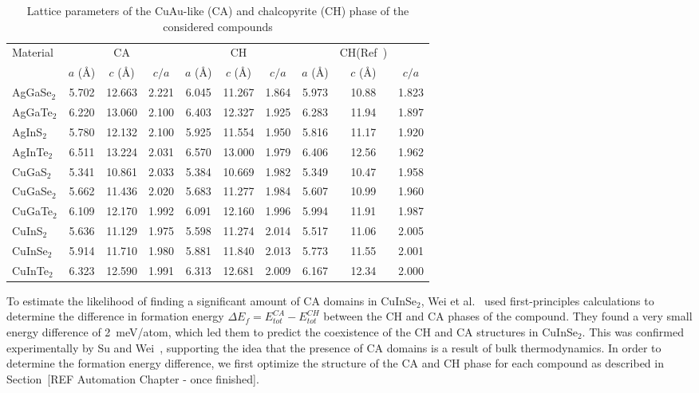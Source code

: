 \begin{refsection}
\begin{table}[ht] 
\centering 
\renewcommand{\arraystretch}{1.5} 
\caption{Lattice parameters of the \mbox{CuAu-like} (CA) and chalcopyrite (CH) 
phase of the considered compounds} 
\label{slme:tab-lattice} 
\begin{tabular*}{\textwidth}{@{\extracolsep{\fill}}lccccccccc}\hline 
\multirow{2}{*}{Material}    & & CA & & & CH & & & CH(Ref~\cite{Hahn1953}) & 
\\ \cmidrule(lr){2-4} \cmidrule(lr){5-7} \cmidrule(lr){8-10} 
 			&  $a$ (\si{\angstrom}) & $c$ (\si{\angstrom}) & $c/a$ & $a$ 
(\si{\angstrom}) & $c$ (\si{\angstrom}) & $c/a$ & $a$ (\si{\angstrom}) & $c$ 
(\si{\angstrom}) & $c/a$ \\\hline 
AgGaSe$_2$ 	& 5.702 & 12.663 & 2.221 & 6.045 & 11.267 & 1.864 & 5.973 & 10.88 
& 1.823 \\ 
AgGaTe$_2$ 	& 6.220 & 13.060 & 2.100 & 6.403 & 12.327 & 1.925 & 6.283 & 11.94 
& 1.897 \\ 
AgInS$_2$  	& 5.780 & 12.132 & 2.100 & 5.925 & 11.554 & 1.950 & 5.816 & 11.17 
& 1.920 \\ 
AgInTe$_2$ 	& 6.511 & 13.224 & 2.031 & 6.570 & 13.000 & 1.979 & 6.406 & 12.56 
& 1.962 \\ 
CuGaS$_2$  	& 5.341 & 10.861 & 2.033 & 5.384 & 10.669 & 1.982 & 5.349 & 10.47 
& 1.958 \\ 
CuGaSe$_2$ 	& 5.662 & 11.436 & 2.020 & 5.683 & 11.277 & 1.984 & 5.607 & 10.99 
& 1.960 \\ 
CuGaTe$_2$ 	& 6.109 & 12.170 & 1.992 & 6.091 & 12.160 & 1.996 & 5.994 & 11.91 
& 1.987 \\ 
CuInS$_2$ 	& 5.636 & 11.129 & 1.975 & 5.598 & 11.274 & 2.014 & 5.517 & 11.06 & 
2.005 \\ 
CuInSe$_2$ 	& 5.914 & 11.710 & 1.980 & 5.881 & 11.840 & 2.013 & 5.773 & 11.55 
& 2.001 \\ 
CuInTe$_2$ 	& 6.323 & 12.590 & 1.991 & 6.313 & 12.681 & 2.009 & 6.167 & 12.34 
& 2.000 \\ \hline 
\end{tabular*} 
\end{table} 

To estimate the likelihood of finding a significant amount of CA domains in 
CuInSe$_2$, Wei et al.~\cite{Wei1999} used first-principles calculations to 
determine the difference in formation energy $\Delta E_f = E_{tot}^{CA} - 
E_{tot}^{CH}$ between the CH and CA phases of the compound. They found a very 
small energy difference of 2~\si{\milli\electronvolt}/atom, which led them to 
predict the coexistence of the CH and CA structures in CuInSe$_2$. This was 
confirmed experimentally by Su and Wei~\cite{Su1999}, supporting the idea that 
the presence of CA domains is a result of bulk thermodynamics. In order to 
determine the formation energy difference, we first optimize the structure of 
the CA and CH phase for each compound as described in Section~[REF Automation 
Chapter - once finished]. 
 

\end{refsection}

